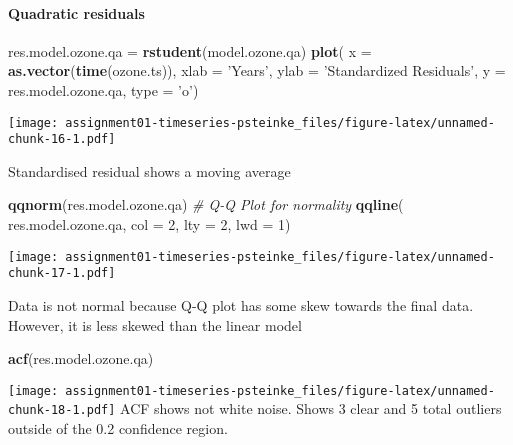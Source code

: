 \documentclass[]{article}
\newenvironment{Shaded}{\begin{snugshade}}{\end{snugshade}}
\newcommand{\CommentTok}[1]{\textcolor[rgb]{0.56,0.35,0.01}{\textit{#1}}}
\newcommand{\DataTypeTok}[1]{\textcolor[rgb]{0.13,0.29,0.53}{#1}}
\newcommand{\DecValTok}[1]{\textcolor[rgb]{0.00,0.00,0.81}{#1}}
\newcommand{\KeywordTok}[1]{\textcolor[rgb]{0.13,0.29,0.53}{\textbf{#1}}}
\newcommand{\NormalTok}[1]{#1}
\newcommand{\StringTok}[1]{\textcolor[rgb]{0.31,0.60,0.02}{#1}}
\let\oldparagraph\paragraph
\renewcommand{\paragraph}[1]{\oldparagraph{#1}\mbox{}}
\begin{document}
\hypertarget{quadratic-residuals}{%
\paragraph{Quadratic residuals}\label{quadratic-residuals}}

\begin{Shaded}
\begin{Highlighting}[]
\NormalTok{res.model.ozone.qa =}\StringTok{ }\KeywordTok{rstudent}\NormalTok{(model.ozone.qa)}
\KeywordTok{plot}\NormalTok{(}
  \DataTypeTok{x =} \KeywordTok{as.vector}\NormalTok{(}\KeywordTok{time}\NormalTok{(ozone.ts)),}
  \DataTypeTok{xlab =} \StringTok{'Years'}\NormalTok{,}
  \DataTypeTok{ylab =} \StringTok{'Standardized Residuals'}\NormalTok{,}
  \DataTypeTok{y =}\NormalTok{ res.model.ozone.qa,}
  \DataTypeTok{type =} \StringTok{'o'}\NormalTok{)}
\end{Highlighting}
\end{Shaded}

\texttt{[image: assignment01-timeseries-psteinke\_files/figure-latex/unnamed-chunk-16-1.pdf]}

Standardised residual shows a moving average

\begin{Shaded}
\begin{Highlighting}[]
\KeywordTok{qqnorm}\NormalTok{(res.model.ozone.qa) }\CommentTok{# Q-Q Plot for normality}
\KeywordTok{qqline}\NormalTok{(}
\NormalTok{  res.model.ozone.qa,}
  \DataTypeTok{col =} \DecValTok{2}\NormalTok{,}
  \DataTypeTok{lty =} \DecValTok{2}\NormalTok{,}
  \DataTypeTok{lwd =} \DecValTok{1}\NormalTok{)}
\end{Highlighting}
\end{Shaded}

\texttt{[image: assignment01-timeseries-psteinke\_files/figure-latex/unnamed-chunk-17-1.pdf]}

Data is not normal because Q-Q plot has some skew towards the final
data. However, it is less skewed than the linear model

\begin{Shaded}
\begin{Highlighting}[]
\KeywordTok{acf}\NormalTok{(res.model.ozone.qa)}
\end{Highlighting}
\end{Shaded}

\texttt{[image: assignment01-timeseries-psteinke\_files/figure-latex/unnamed-chunk-18-1.pdf]}
ACF shows not white noise. Shows 3 clear and 5 total outliers outside of
the 0.2 confidence region.
\end{document}

